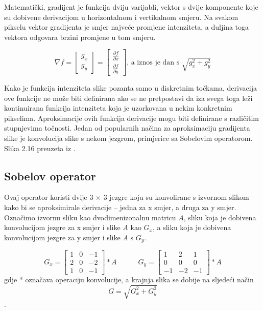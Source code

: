 \documentclass[times, utf8, zavrsni, numeric]{fer}
\begin{document}
Matematički, gradijent je funkcija dviju varijabli, vektor s dvije komponente koje su dobivene
derivacijom u horizontalnom i vertikalnom smjeru. Na svakom pikselu vektor gradijenta je smjer 
najveće promjene intenziteta, a duljina toga vektora odgovara brzini promjene u tom smjeru.

\[
\nabla f = \left[ \begin{array}{c} g_x \\ g_y \end{array}\right]
 = \left[ \begin{array}{c} \frac{\partial f}{\partial x} \\ \frac{\partial f}{\partial y} \end{array}\right]
 \textrm{, a iznos je dan s  } \sqrt{g_x^2 + g_y^2}
\]

\bigbreak

Kako je funkcija intenziteta slike pozanta samo u diskretnim točkama, derivacija ove funkcije 
ne može biti definirana ako se ne pretpostavi da iza svega toga leži kontinuirana funkcija 
intenziteta koja je uzorkovana u nekim konkretnim pikselima. Aproksimacije ovih funkcija derivacije 
mogu biti definirane s različitim stupnjevima točnosti. Jedan od popularnih načina za 
aproksimaciju gradijenta slike je konvolucija slike s nekom jezgrom, primjerice sa Sobelovim operatorom.
Slika 2.16 preuzeta iz \citep{wikiGradient}.

\newpage

\subsection{Sobelov operator}

Ovaj operator koristi dvije 3 \(\times\) 3 jezgre koju su konvolirane s izvornom slikom kako bi se aproksimirale 
derivacije – jedna za x smjer, a druga za y smjer. Označimo izvornu sliku kao dvodimenizonalnu matricu \(A\), sliku
koja je dobivena konvolucijom jezgre za x smjer i slike \(A\) kao \(G_x\), a sliku koja je dobivena konvolucijom 
jezgre za y smjer i slike \(A\) s \(G_y\).

\[G_x = 
\begin{bmatrix} 
1 & 0 & -1\\ 
2 & 0 & -2\\ 
1 & 0 & -1 
\end{bmatrix}
 * A
  \quad\quad\quad
 G_y = 
\begin{bmatrix} 
 1 & 2 & 1\\ 
 0 & 0 & 0\\ 
 -1 & -2 & -1
\end{bmatrix}
 * A
\]
\bigbreak
gdje * označava operaciju konvolucije, a krajnja slika se dobije na sljedeći način 
\[
G = \sqrt{G_x^2 + G_y^2}
\].
\end{document}
